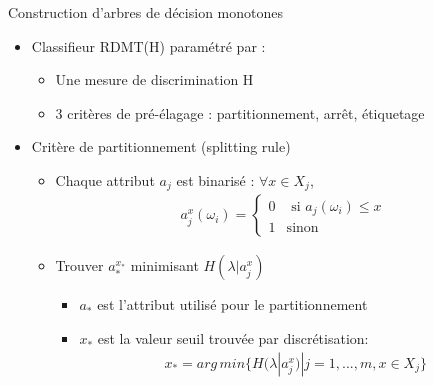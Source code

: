 \documentclass[usenames,dvipsnames]{beamer}
\newcommand{\beamcite}[1]{\hfill {\footnotesize \textcite{#1}}}
\begin{document}
\begin{frame}{Construction d'arbres de décision monotones \beamcite{marsala-rank}}
    \begin{itemize}
        \item Classifieur RDMT(H) paramétré par : 
            \begin{itemize}
                \item Une mesure de discrimination H
                \item 3 critères de pré-élagage : partitionnement, arrêt, étiquetage
            \end{itemize}
        \item Critère de partitionnement (splitting rule)
            \begin{itemize}
                \item Chaque attribut $a_j$ est binarisé : $\forall x \in X_j$,
                    \begin{equation*}
                    \begin{array}{cl}
                        a^x_j(\omega_i) = \begin{cases}{0} &\text{ si } a_j(\omega_i) \leq x\\
                          {1} &\text{sinon}\end{cases}
                     \end{array}
                     \end{equation*}
                \item Trouver $a^{x_*}_*$ minimisant $H(\lambda|a^x_j)$
                    \begin{itemize}
                        \item $a_*$ est l'attribut utilisé pour le partitionnement
                        \item $x_*$ est la valeur seuil trouvée par discrétisation: 
                            \begin{equation*}
                            \begin{array}{cl}
                                x_* = arg\,min \{H(\lambda|a^x_j) | j=1,...,m, x \in X_j\}
                            \end{array}
                            \end{equation*}
                    \end{itemize}
            \end{itemize}
    \end{itemize}
\end{frame}
\end{document}
